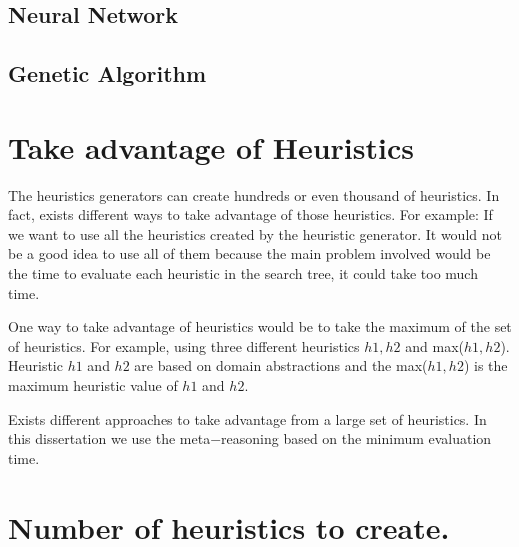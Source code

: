 \documentclass[a4paper,12pt]{article}
\newcommand{\Om}[1]{\small $\omega_{#1}$}
\newcommand{\Vpi}[1]{$\varphi_{#1}$}
\begin{document}
\subsection{Neural Network}


\subsection{Genetic Algorithm}



\section{Take advantage of Heuristics}
The heuristics generators can create hundreds or even thousand of heuristics. In fact, exists different ways to take advantage of those heuristics. For example: If we want to use all the heuristics created by the heuristic generator. It would not be a good idea to use all of them because the main problem involved would be the time to evaluate each heuristic in the search tree, it could take too much time.

One way to take advantage of heuristics would be to take the maximum of the set of heuristics. For example, using three different heuristics $h1, h2$ and max($h1, h2$). Heuristic $h1$ and $h2$ are based on domain abstractions and the max($h1, h2$) is the maximum heuristic value of $h1$ and $h2$.

Exists different approaches to take advantage from a large set of heuristics. In this dissertation we use the meta$-$reasoning based on the minimum evaluation time.


\section{Number of heuristics to create.}

\end{document}
